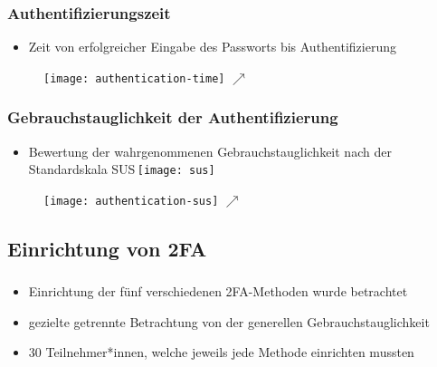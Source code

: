 \begin{frame}
    \frametitle{Authentifizierungszeit}

    \begin{itemize}
        \item Zeit von erfolgreicher Eingabe des Passworts bis Authentifizierung
    \end{itemize}


    \begin{figure}[c]
        \texttt{[image: authentication-time]}
        \(\nearrow \)
    \end{figure}

\end{frame}

\begin{frame}
    \frametitle{Gebrauchstauglichkeit der Authentifizierung}

    \begin{itemize}
        \item Bewertung der wahrgenommenen Gebrauchstauglichkeit nach der Standardskala SUS\,\texttt{[image: sus]}
        \tiny{\textcolor{white}{}}
    \end{itemize}

    \begin{figure}[c]
        \texttt{[image: authentication-sus]}
        \(\nearrow \)
    \end{figure}


\end{frame}

\subsection{Einrichtung von 2FA}
\begin{frame}
    \frametitle{\currentsectionname}

    \begin{itemize}
        \item Einrichtung der fünf verschiedenen 2FA-Methoden wurde betrachtet
        \item gezielte getrennte Betrachtung von der generellen Gebrauchstauglichkeit
        \item 30 Teilnehmer*innen, welche jeweils jede Methode einrichten mussten
    \end{itemize}

\end{frame}

